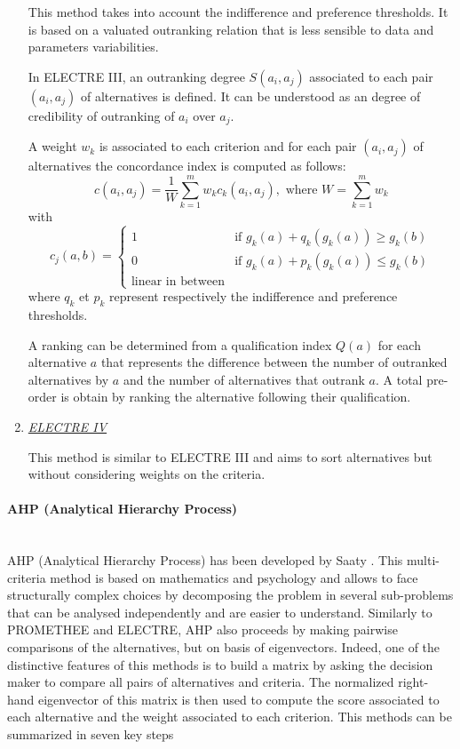 \begin{enumerate}
This method takes into account the indifference and preference thresholds. It is based on a valuated outranking relation that is less sensible to data and parameters variabilities.

In ELECTRE III, an outranking degree $S(a_i, a_j)$ associated to each pair $(a_i, a_j)$ of alternatives is defined. It can be understood as an \og degree of credibility of outranking \fg of $a_i$ over $a_j$.

A weight $w_{k}$ is associated to each criterion and for each pair $(a_i, a_j)$ of alternatives the concordance index is computed as follows:
\begin{equation}
c(a_i, a_j) = \frac{1}{W} \sum_{k=1}^{m} w_{k} c_{k}(a_i, a_j), \text{ where } W = \sum_{k=1}^{m} w_{k}
\end{equation}
with
\begin{equation}
c_{j}(a,b) = \begin{cases}
	1& \text{if $g_{k}(a)+q_{k}(g_{k}(a)) \geq g_{k}(b)$}\\
	0& \text{if $g_{k}(a)+p_{k}(g_{k}(a)) \leq g_{k}(b)$}\\
	\text{linear in between}
	\end{cases}
\end{equation}
where $q_{k}$ et $p_{k}$ represent respectively the indifference and preference thresholds.

A ranking can be determined from a qualification index $Q(a)$ for each alternative $a$ that represents the difference between the number of outranked alternatives by $a$ and the number of alternatives that outrank $a$. A total pre-order is obtain by ranking the alternative following their qualification.

\item \textit{\underline{ELECTRE IV}}

This method is similar to ELECTRE III and aims to sort alternatives but without considering weights on the criteria.
\end{enumerate}

\paragraph{AHP (Analytical Hierarchy Process)}~\\
AHP (Analytical Hierarchy Process) has been developed by Saaty \cite{MAHP}. This multi-criteria method is based on mathematics and psychology and allows to face structurally complex choices by decomposing the problem in several sub-problems that can be analysed independently and are easier to understand. Similarly to PROMETHEE and ELECTRE, AHP also proceeds by making pairwise comparisons of the alternatives, but on basis of eigenvectors. Indeed, one of the distinctive features of this methods is to build a matrix by asking the decision maker to compare all pairs of alternatives and criteria. The normalized right-hand eigenvector of this matrix is then used to compute the score associated to each alternative and the weight associated to each criterion. This methods can be summarized in seven key steps \cite{Vaidya20061}


